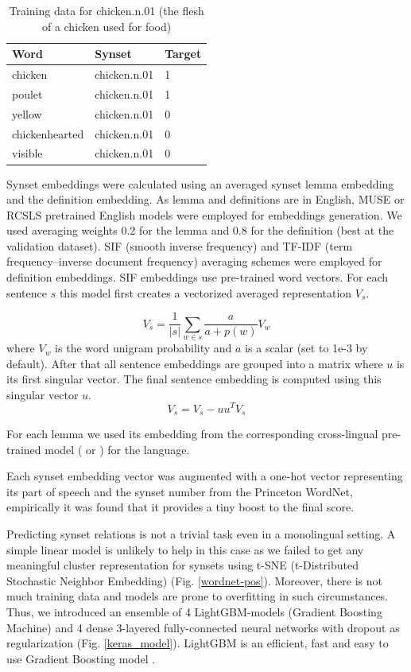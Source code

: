 \documentclass[conference]{IEEEtran}
\begin{document}
	\begin{table}[!htbp]
		\small
		\caption{Training data for chicken.n.01 (the flesh of a chicken used for food)}
		\label{wordnet-training-data}		
		\centering
		\begin{tabular}{|l|l|l|}
			\hline
			Word & Synset & Target
			\\
			\hline
			chicken & chicken.n.01 & 1
			\\
			poulet & chicken.n.01 & 1
			\\
			yellow & chicken.n.01 & 0
			\\
			chickenhearted & chicken.n.01 & 0
			\\
			visible & chicken.n.01 & 0
			\\
			\hline
		\end{tabular}
		
	\end{table}
	
	Synset embeddings were calculated using an averaged synset lemma embedding and the definition embedding. As lemma and definitions are in English, MUSE or RCSLS pretrained English models were employed for embeddings generation. We used averaging weights 0.2 for the lemma and 0.8 for the definition (best at the validation dataset). SIF (smooth inverse frequency) and TF-IDF (term frequency–inverse document frequency) averaging schemes were employed for definition embeddings. SIF \cite{Arora2017} embeddings use pre-trained word vectors. For each sentence $s$ this model first creates a vectorized averaged representation $V_s$.
	
	$$V_s = \dfrac{1}{|s|}\sum_{w \in s} \frac{a}{a + p(w)}V_w$$
	where $V_w$ is the word unigram probability and $a$ is a scalar (set to 1e-3 by default).
	After that all sentence embeddings are grouped into a matrix where $u$ is its first singular vector. The final sentence embedding is computed using this singular vector $u$.
	$$V_s = V_s - uu^TV_s$$
	
	
	For each lemma we used its embedding from the corresponding cross-lingual pre-trained model (\cite{muse} or \cite{joulin2018loss}) for the language.
	
	Each synset embedding vector was augmented with a one-hot vector representing its part of speech and the synset number from the Princeton WordNet, empirically it was found that it provides a tiny boost to the final score.
	
	Predicting synset relations is not a trivial task even in a monolingual setting. A simple linear model is unlikely to help in this case as we failed to get any meaningful cluster representation for synsets using t-SNE (t-Distributed Stochastic Neighbor Embedding) \cite{tsne} (Fig. \ref{wordnet-pos}). Moreover, there is not much training data and models are prone to overfitting in such circumstances. Thus, we introduced an ensemble of 4 LightGBM-models (Gradient Boosting Machine) \cite{lgbm} and 4 dense 3-layered fully-connected neural networks with dropout as regularization \cite{dropout} (Fig. \ref{keras_model}). LightGBM is an efficient, fast and easy to use Gradient Boosting model \cite{natekin2013gradient}.
	
\end{document}
